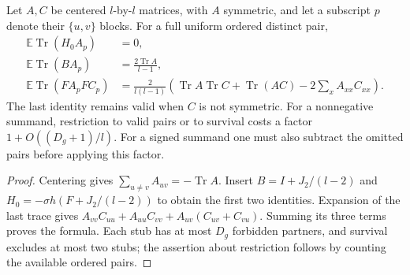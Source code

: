 \begin{lemma}\label{lem:early-pair-contractions}
Let \(A,C\) be centered \(l\)-by-\(l\) matrices, with \(A\) symmetric,
and let a subscript \(p\) denote their \(\{u,v\}\) blocks. For a full
uniform ordered distinct pair,
\[
\begin{split}
 \mathbb E\operatorname{Tr}(H_0A_p)&=0,\\
 \mathbb E\operatorname{Tr}(BA_p)&=\frac{2\operatorname{Tr}A}{l-1},\\
 \mathbb E\operatorname{Tr}(FA_pFC_p)
 &=\frac{2}{l(l-1)}\left(
       \operatorname{Tr}A\operatorname{Tr}C+
       \operatorname{Tr}(AC)-2\sum_x A_{xx}C_{xx}\right).
\end{split}
\]
The last identity remains valid when \(C\) is not symmetric. For a
nonnegative summand, restriction to valid pairs or to survival costs a
factor \(1+O((D_g+1)/l)\). For a signed summand one must also subtract
the omitted pairs before applying this factor.
\end{lemma}
\begin{proof}
Centering gives \(\sum_{u\ne v}A_{uv}=-\operatorname{Tr}A\).
Insert \(B=I+J_2/(l-2)\) and
\(H_0=-\sigma h(F+J_2/(l-2))\) to obtain the first two
identities. Expansion of the last trace gives
\(A_{vv}C_{uu}+A_{uu}C_{vv}+A_{uv}(C_{uv}+C_{vu})\).
Summing its three terms proves the formula. Each stub has at most
\(D_g\) forbidden partners, and survival excludes at most two stubs;
the assertion about restriction follows by counting the available
ordered pairs.
\end{proof}

